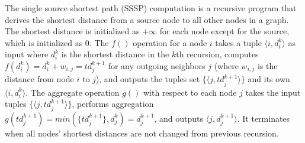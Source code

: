 {\color{green}
 The single source shortest path (SSSP) computation is a recursive program that derives the shortest distance from a source node to all other nodes in a graph. The shortest distance is initialized as $+\infty$ for each node except for the source, which is initialized as 0. The $f()$ operation for a node $i$ takes a tuple $\langle i,d_i^k\rangle$ as input where $d_i^k$ is the shortest distance in the $k$th recursion, computes $f(d_i^k)=d_i^k+w_{i,j}=td_j^{k+1}$ for any outgoing neighbors $j$ (where $w_{i,j}$ is the distance from node $i$ to $j$), and outputs the tuples set $\{\langle j,td_j^{k+1}\rangle\}$ and its own $\langle i,d_i^k\rangle$. The aggregate operation $g()$ with respect to each node $j$ takes the input tuples $\{\langle j,td_j^{k+1}\rangle\}$, performs aggregation $g(td_j^{k+1})=min(\{td_j^{k+1}\},d_j^k)=d_j^{k+1}$, and outputs $\langle j,d_j^{k+1}\rangle$. It terminates when all nodes' shortest distances are not changed from previous recursion.
}

